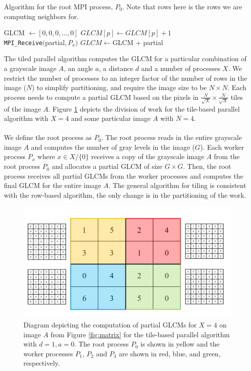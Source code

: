 \documentclass{article}
\begin{document}
\begin{algorithm}
    \caption{Algorithm for the root MPI process, $P_0$. Note that rows here is the rows we are computing neighbors for.}\label{alg:2}
    \begin{algorithmic}
        \State GLCM $\gets [0, 0, 0, ..., 0]$
            \State $GLCM[p] \gets GLCM[p] + 1$
        \EndIf
        \EndWhile \\
            \State \texttt{MPI\_Receive}$($partial$, P_x)$
            \State $GLCM \gets $GLCM + partial
        \EndFor
    \end{algorithmic}
\end{algorithm}
    The tiled parallel algorithm computes the GLCM for a particular combination of a grayscale image $A$, an angle $a$, a distance $d$ and a number of processes $X$. We restrict the number of processes to an integer factor of the number of rows in the image ($N$) to simplify partitioning, and require the image size to be $N \times N$. Each process needs to compute a partial GLCM based on the pixels in $\frac{N}{\sqrt{X}} \times \frac{N}{\sqrt{X}}$ tiles of the image $A$. Figure \ref{fig:tiles} depicts the division of work for the tile-based parallel algorithm with $X = 4$ and some particular image $A$ with $N = 4$. \\ \\ 
    We define the root process as $P_0$. The root process reads in the entire grayscale image $A$ and computes the number of gray levels in the image ($G$). Each worker process $P_x$ where $x \in X / \{0\}$ receives a copy of the grayscale image $A$ from the root process $P_0$ and allocates a partial GLCM of size $G \times G$. Then, the root process receives all partial GLCMs from the worker processes and computes the final GLCM for the entire image $A$. The general algorithm for tiling is consistent with the row-based algorithm, the only change is in the partitioning of the work. 
\begin{figure}[h]
      \includegraphics[width=\linewidth]{tile_partitioning.jpg}
      \caption{Diagram depicting the computation of partial GLCMs for $X = 4$ on image $A$ from Figure \ref{fig:matrix} for the tile-based parallel algorithm with $d = 1, a = 0$. The root process $P_0$ is shown in yellow and the worker processes $P_1$, $P_2$ and $P_3$ are shown in red, blue, and green, respectively.}
      \label{fig:tiles}
    \end{figure}
\end{document}
